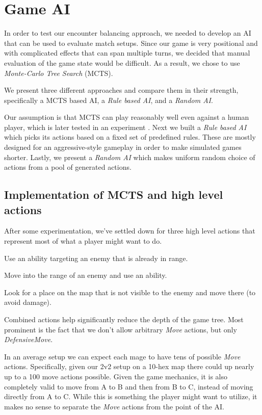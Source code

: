 \chapter{Game AI}

In order to test our encounter balancing approach, we needed to develop an
AI that can be used to evaluate match setups. Since our game is very
positional and with complicated effects that can span multiple turns, we
decided that manual evaluation of the game state would be difficult. As a
result, we chose to use \emph{Monte-Carlo Tree Search} (MCTS).

We present three different approaches and compare them in their strength,
specifically a MCTS based AI, a \emph{Rule based AI}, and a \emph{Random
AI}.

Our assumption  is that MCTS can play reasonably well
even against a human player, which is later tested in an experiment
. Next we built a \emph{Rule based AI} which picks
its actions based on a fixed set of predefined rules. These are mostly
designed for an aggressive-style gameplay in order to make simulated games
shorter. Lastly, we present a \emph{Random AI} which makes uniform random
choice of actions from a pool of generated actions.


\section{Implementation of MCTS and high level actions}

After some experimentation, we've settled down for three high level actions
that represent most of what a player might want to do.

\begin{description}[align=right,labelwidth=3cm]
\item [AbilityUse] Use an ability targeting an enemy that is already in range.
\item [AttackMove] Move into the range of an enemy and use an ability.
\item [DefensiveMove] Look for a place on the map that is not visible to the enemy and move there (to avoid damage).
\end{description}

Combined actions help significantly reduce the depth of the game tree. Most
prominent is the fact that we don't allow arbitrary \emph{Move} actions, but
only \emph{DefensiveMove}.

In an average setup we can expect each mage to have tens of possible
\emph{Move} actions. Specifically, given our 2v2 setup on a 10-hex map there
could up nearly up to a 100 move actions possible. Given the game mechanics, it
is also completely valid to move from A to B and then from B to C, instead of
moving directly from A to C. While this is something the player might want to
utilize, it makes no sense to separate the \emph{Move} actions from the point
of the AI\@.

